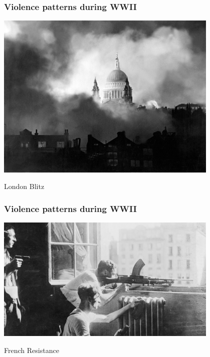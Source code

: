 \documentclass[aspectratio=43]{beamer}
\begin{document}
\begin{frame}
\frametitle{Violence patterns during WWII}
\centering

\includegraphics[width = 0.8\textwidth]{img/wwii-londonblitz}

London Blitz

\end{frame}

\begin{frame}
\frametitle{Violence patterns during WWII}
\centering

\includegraphics[width = 0.8\textwidth]{img/wwii-resistance}

French Resistance

\end{frame}
\end{document}
